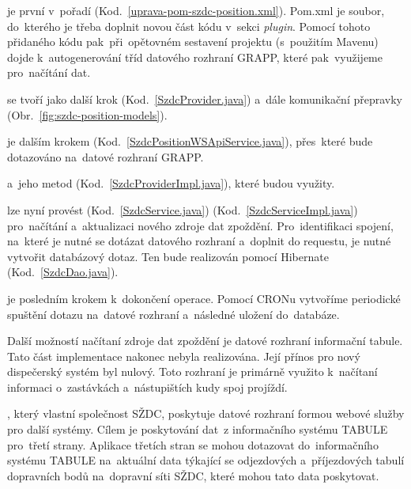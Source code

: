 je první v~pořadí (Kod.~\ref{uprava-pom-szdc-position.xml}). Pom.xml je soubor, do~kterého je třeba doplnit novou část kódu v~sekci \textit{plugin}. Pomocí tohoto přidaného kódu pak~při~opětovném sestavení projektu (s~použitím Mavenu) dojde k~autogenerování tříd datového rozhraní GRAPP, které pak~využijeme pro~načítání dat.


 se tvoří jako další krok (Kod.~\ref{SzdcProvider.java}) a~dále komunikační přepravky (Obr.~\ref{fig:szdc-position-models}).
 	

 je dalším krokem (Kod.~\ref{SzdcPositionWSApiService.java}), přes~které bude dotazováno na~datové rozhraní GRAPP.


 a~jeho metod (Kod.~\ref{SzdcProviderImpl.java}), které budou využity.


 lze nyní provést (Kod.~\ref{SzdcService.java}) (Kod.~\ref{SzdcServiceImpl.java}) pro~načítání a~aktualizaci nového zdroje dat zpoždění. Pro~identifikaci spojení, na~které je nutné se dotázat datového rozhraní a~doplnit do requestu, je nutné vytvořit databázový dotaz. Ten bude realizován pomocí Hibernate (Kod.~\ref{SzdcDao.java}).


 je posledním krokem k~dokončení operace. Pomocí CRONu vytvoříme periodické spuštění dotazu na~datové rozhraní a~následné uložení do~databáze.



Další možností načítaní zdroje dat zpoždění je datové rozhraní informační tabule. Tato část implementace nakonec nebyla realizována. Její přínos pro nový dispečerský systém byl nulový. Toto rozhraní je primárně  využito k~načítaní informaci o~zastávkách a~nástupištích kudy spoj projíždí.

, který vlastní společnost SŽDC, poskytuje datové rozhraní formou webové služby pro další systémy. Cílem je poskytování dat~z informačního systému TABULE pro~třetí strany. Aplikace třetích stran se mohou dotazovat do~informačního systému TABULE na~aktuální data týkající se odjezdových a~příjezdových tabulí dopravních bodů na~dopravní síti SŽDC, které mohou tato data poskytovat.

